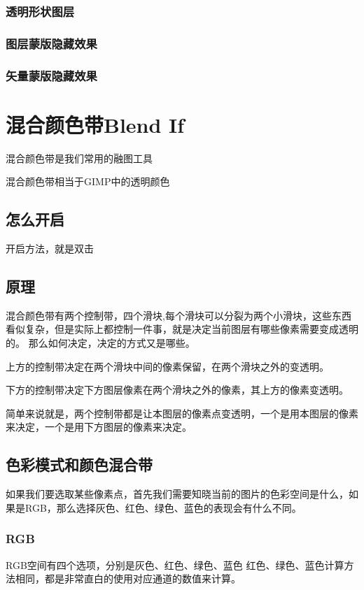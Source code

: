 \subsection{透明形状图层}
\newpage
\subsection{图层蒙版隐藏效果}
\newpage
\subsection{矢量蒙版隐藏效果}
\newpage
\chapter{混合颜色带Blend If}
\begin{introduction}
	\item 混合颜色带是我们常用的融图工具
	\item 混合颜色带相当于GIMP中的透明颜色
\end{introduction}
\section{怎么开启}
开启方法，就是双击
\section{原理}
混合颜色带有两个控制带，四个滑块,每个滑块可以分裂为两个小滑块，这些东西看似复杂，但是实际上都控制一件事，就是决定当前图层有哪些像素需要变成透明的。
那么如何决定，决定的方式又是哪些。

上方的控制带决定在两个滑块中间的像素保留，在两个滑块之外的变透明。

下方的控制带决定下方图层像素在两个滑块之外的像素，其上方的像素变透明。

\begin{notice}
\item 简单来说就是，两个控制带都是让本图层的像素点变透明，一个是用本图层的像素来决定，一个是用下方图层的像素来决定。
\end{notice}


\section{色彩模式和颜色混合带}

如果我们要选取某些像素点，首先我们需要知晓当前的图片的色彩空间是什么，如果是RGB，那么选择灰色、红色、绿色、蓝色的表现会有什么不同。

\subsection{RGB}
RGB空间有四个选项，分别是灰色、红色、绿色、蓝色
红色、绿色、蓝色计算方法相同，都是非常直白的使用对应通道的数值来计算。

